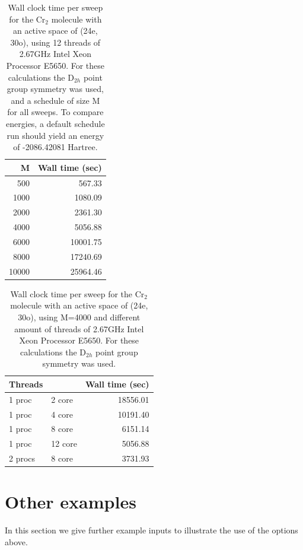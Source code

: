\documentclass[letterpaper,12pt,aps, pra]{revtex4-1}
\begin{document}
\begin{table}
\begin{center}
\begin{tabular}{rr}
\hline
\hline
M& Wall time (sec)\\
\hline
500     &567.33\\
1000	&1080.09\\
2000	&2361.30\\
4000	&5056.88\\
6000	&10001.75\\
8000	&17240.69\\
10000	&25964.46\\
\hline
\hline
\end{tabular}
\end{center}
\caption{Wall clock time per sweep for the Cr$_2$ molecule with an active space
of (24e, 30o), using 12 threads of 2.67GHz Intel Xeon Processor E5650. For
these calculations the D$_{2h}$ point group symmetry was used, and a schedule
of size M for all sweeps.
To compare energies, a default schedule run should yield an energy of -2086.42081 Hartree.
} \label{tab:timing}
\end{table}

\begin{table}
\begin{center}
\begin{tabular}{llr}
\hline
\hline
Threads && Wall time (sec)\\
\hline
1 proc &2 core  &18556.01\\
1 proc &4 core  &10191.40\\
1 proc &8 core  &6151.14\\
1 proc &12 core &5056.88\\
2 procs &8 core &3731.93\\
\hline
\hline
\end{tabular}
\end{center}
\caption{Wall clock time per sweep for the Cr$_2$ molecule with an
active space of (24e, 30o), using M=4000 and different amount of
threads of 2.67GHz Intel Xeon Processor E5650. For these calculations
the D$_{2h}$ point group symmetry was used.} \label{tab:thread}
\end{table}

\section{Other examples}
In this section we give further example inputs to illustrate
the use of the options above.
\end{document}
